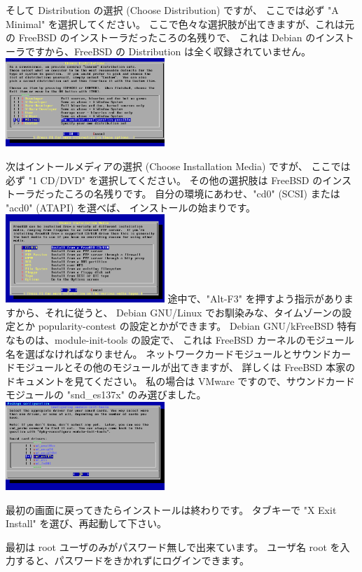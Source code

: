 \documentclass[mingoth,a4paper]{jsarticle}
\begin{document}
そして Distribution の選択 (Choose Distribution) ですが、
ここでは必ず "A Minimal" を選択してください。
ここで色々な選択肢が出てきますが、これは元の FreeBSD のインストーラだったころの名残りで、
これは Debian のインストーラですから、FreeBSD の Distribution は全く収録されていません。
\includegraphics[width=6cm]{image200906/kfreebsd06.png}

次はイントールメディアの選択 (Choose Installation Media) ですが、
ここでは必ず "1 CD/DVD" を選択してください。
その他の選択肢は FreeBSD のインストーラだったころの名残りです。
自分の環境にあわせ、"cd0" (SCSI) または "acd0" (ATAPI) を選べば、
インストールの始まりです。
\includegraphics[width=6cm]{image200906/kfreebsd07.png}
途中で、"Alt-F3" を押すよう指示がありますから、それに従うと、
Debian GNU/Linux でお馴染みな、タイムゾーンの設定とか popularity-contest 
の設定とかができます。
Debian GNU/kFreeBSD 特有なものは、module-init-tools の設定で、
これは FreeBSD カーネルのモジュール名を選ばなければなりません。
ネットワークカードモジュールとサウンドカードモジュールとその他のモジュールが出てきますが、
詳しくは FreeBSD 本家のドキュメントを見てください。
私の場合は VMware ですので、サウンドカードモジュールの "snd\_es137x" のみ選びました。
\includegraphics[width=6cm]{image200906/kfreebsd12.png}

最初の画面に戻ってきたらインストールは終わりです。
タブキーで "X Exit Install" を選び、再起動して下さい。

最初は root ユーザのみがパスワード無しで出来ています。
ユーザ名 root を入力すると、パスワードをきかれずにログインできます。
\end{document}
